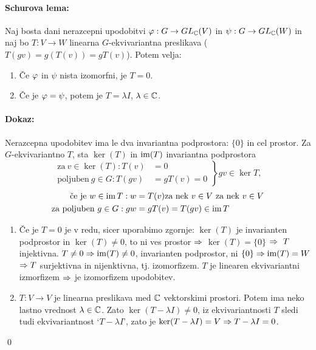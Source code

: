 \begin{trditev}
	\paragraph{Schurova lema:} Naj bosta dani nerazcepni upodobitvi $\varphi : G \to GL_{\mathbb{C}}(V)$ in $\psi : G \to GL_{\mathbb{C}}(W)$ in naj
	bo $T : V \to W$ linearna $G$-ekvivariantna preslikava ($T(gv) = g(T(v)) = gT(v)$). Potem velja:
	\begin{enumerate}
		\item{\v Ce $\varphi$ in $\psi$ nista izomorfni, je $T = 0$.}
		\item{\v Ce je $\varphi = \psi$, potem je $T = \lambda I$, $\lambda \in \mathbb{C}$.}
	\end{enumerate}
\end{trditev}

\paragraph{Dokaz:} Nerazcepna upodobitev ima le dva invariantna podprostora: $\{0\}$ in cel prostor. Za $G$-ekvivariantno $T$, sta
$\ker(T)$ in $\operatorname{im}(T)$ invariantna podprostora
\[
	\left.\begin{array}{rl}
	\text{za}\ v \in \ker(T) : T(v) &= 0 \\
	\text{poljuben}\ g \in G : T(gv) &= gT(v) = 0
	\end{array}\right\} gv \in \ker T,
\]
\begin{align*}
	\text{\v ce je}\ w \in \im T : w &= T(v) \text{za nek}\ v \in V\ \text{za nek}\ v \in V\\
	\text{za poljuben}\ g \in G : gw &= gT(v) = T(gv) \in \im T
\end{align*}

\begin{enumerate}
	\item{\v Ce je $T = 0$ je v redu, sicer uporabimo zgornje: $\ker(T)$ je invarianten podprostor in $\ker(T)\neq0$, to ni
		ves prostor $\Rightarrow$ $\ker(T) = \{0\}$ $\Rightarrow\ T$ injektivna. $T \neq 0 \Rightarrow \operatorname{im}(T)\neq 0$, invarianten podprostor,
		ni $\{0\} \Rightarrow \operatorname{im}(T) = W$ $\Rightarrow T$ surjektivna in nijenktivna, tj. izomorfizem. $T$ je linearen ekvivariantni izmorfizem
		$\Rightarrow$ je izomorfizem upodobitev.}
	\item{$T : V \to V$ je linearna preslikava med $\mathbb{C}$ vektorskimi prostori. Potem ima neko lastno vrednost $\lambda \in \mathbb{C}$. Zato
		$\ker(T - \lambda I) \neq 0$, iz ekvivariantnosti $T$ sledi tudi ekvivariantnost `$T - \lambda I$', zato je $\ker(T -
		\lambda I) = V \Rightarrow T - \lambda I = 0$.}
\end{enumerate}
\qed

